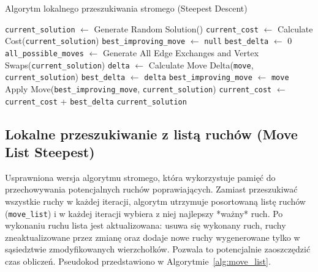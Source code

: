 \documentclass[12pt,a4paper]{article}
\begin{document}
\begin{algorithm}[H]
\caption{Algorytm lokalnego przeszukiwania stromego (Steepest Descent)}
\label{alg:steepest}
\begin{algorithmic}[1]
\State \texttt{current\_solution} $\leftarrow$ Generate Random Solution()
\State \texttt{current\_cost} $\leftarrow$ Calculate Cost(\texttt{current\_solution})
\Repeat
    \State \texttt{best\_improving\_move} $\leftarrow$ \texttt{null}
    \State \texttt{best\_delta} $\leftarrow$ 0
    \State \texttt{all\_possible\_moves} $\leftarrow$ Generate All Edge Exchanges and Vertex Swaps(\texttt{current\_solution})
        \State \texttt{delta} $\leftarrow$ Calculate Move Delta(\texttt{move}, \texttt{current\_solution})
            \State \texttt{best\_delta} $\leftarrow$ \texttt{delta}
            \State \texttt{best\_improving\_move} $\leftarrow$ \texttt{move}
        \EndIf
    \EndFor
        \State Apply Move(\texttt{best\_improving\_move}, \texttt{current\_solution})
        \State \texttt{current\_cost} $\leftarrow$ \texttt{current\_cost} + \texttt{best\_delta}
    \EndIf
{}
\State \Return \texttt{current\_solution}
\end{algorithmic}
\end{algorithm}

\subsection{Lokalne przeszukiwanie z listą ruchów (Move List Steepest)}
Usprawniona wersja algorytmu stromego, która wykorzystuje pamięć do przechowywania potencjalnych ruchów poprawiających. Zamiast przeszukiwać wszystkie ruchy w każdej iteracji, algorytm utrzymuje posortowaną listę ruchów (\texttt{move\_list}) i w każdej iteracji wybiera z niej najlepszy *ważny* ruch. Po wykonaniu ruchu lista jest aktualizowana: usuwa się wykonany ruch, ruchy zneaktualizowane przez zmianę oraz dodaje nowe ruchy wygenerowane tylko w sąsiedztwie zmodyfikowanych wierzchołków. Pozwala to potencjalnie zaoszczędzić czas obliczeń. Pseudokod przedstawiono w Algorytmie~\ref{alg:move_list}.
\end{document}
